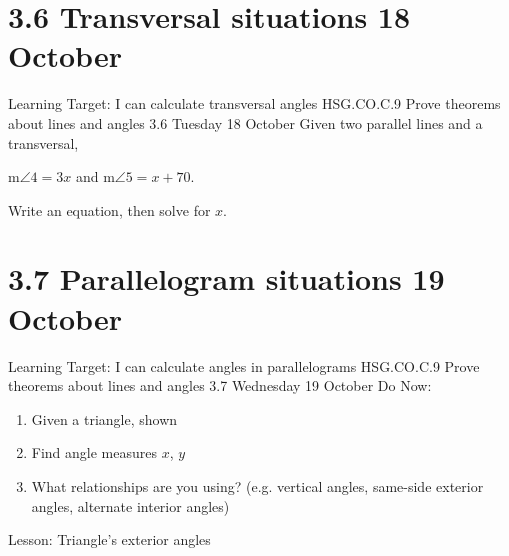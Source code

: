 \documentclass[onlytextwidth]{beamer}
\newcommand\paraticks{}
\def\paraticks{{Straight Barb[reversed, scale=2]}-{Straight Barb[scale=2]}}
\begin{document}
\section{3.6 Transversal situations \hfill 18 October}
\begin{frame}{Learning Target: I can calculate transversal angles}
  {HSG.CO.C.9 Prove theorems about lines and angles  \hfill \alert{3.6 Tuesday 18 October}}
  Given two parallel lines and a transversal, \par \smallskip
    m$\angle 4 = 3x$ and m$\angle 5 = x + 70$. \par \smallskip 
    Write an equation, then solve for $x$.
  \begin{flushright}
  \end{flushright}
\end{frame}

\section{3.7 Parallelogram situations \hfill 19 October}
\begin{frame}{Learning Target: I can calculate angles in parallelograms}
  {HSG.CO.C.9 Prove theorems about lines and angles  \hfill \alert{3.7 Wednesday 19 October}}
  Do Now: 
  \begin{multicols}{2}
    \begin{enumerate}
      \item Given a triangle, shown
      \item Find angle measures $x$, $y$
      \item What relationships are you using? (e.g. vertical angles, same-side exterior angles, alternate interior angles)
    \end{enumerate}
  \end{multicols}
  Lesson: Triangle's exterior angles
\end{frame}
\end{document}
